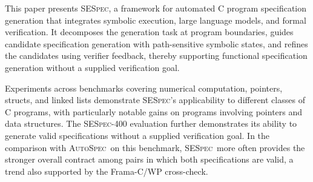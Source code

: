 \documentclass[lettersize,journal]{IEEEtran}
\def\revcolor{blue}
\DeclareRobustCommand{\rev}[1]{{\color{\revcolor}#1}}
\newcommand{\toolname}{\textsc{SESpec}}
\newcommand{\autospec}{\textsc{AutoSpec}}
\begin{document}


\rev{This paper presents \toolname, a framework for automated C program specification generation that integrates symbolic execution, large language models, and formal verification. It decomposes the generation task at program boundaries, guides candidate specification generation with path-sensitive symbolic states, and refines the candidates using verifier feedback, thereby supporting functional specification generation without a supplied verification goal.}

\rev{Experiments across benchmarks covering numerical computation, pointers, structs, and linked lists demonstrate \toolname's applicability to different classes of C programs, with particularly notable gains on programs involving pointers and data structures. The \toolname-400 evaluation further demonstrates its ability to generate valid specifications without a supplied verification goal. In the comparison with \autospec\ on this benchmark, \toolname\ more often provides the stronger overall contract among pairs in which both specifications are valid, a trend also supported by the Frama-C/WP cross-check.}
\end{document}
